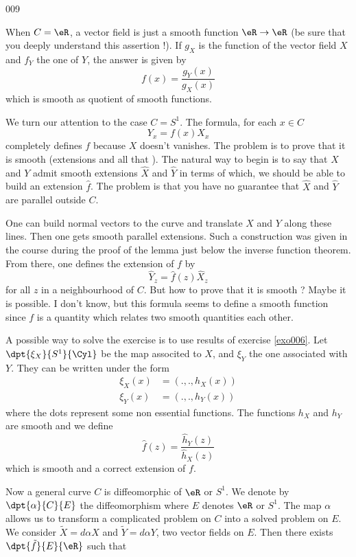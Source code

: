 \begin{corrige}{009}


When $C=\eR$, a vector field is just a smooth function $\eR\to\eR$ (be sure that you deeply understand this assertion !). If $g_X$ is the function of the vector field $X$ and $f_Y$ the one of $Y$, the answer is given by 
\begin{equation}
  f(x)=\frac{ g_Y(x) }{ g_X(x) }
\end{equation}
which is smooth as quotient of smooth functions.

We turn our attention to the case $C=S^1$. The formula, for each $x\in C$
\[ 
  Y_x=f(x)X_x
\]
completely defines $f$ because $X$ doesn't vanishes. The problem is to prove that it is smooth (extensions and all that {\huge\frownie}). The natural way to begin is to say that $X$ and $Y$ admit smooth extensions $\hat X$ and $\hat Y$ in terms of which, we should be able to build an extension $\hat f$. The problem is that you have no guarantee that $\hat X$ and $\hat Y$ are parallel outside $C$. 

One can build normal vectors to the curve and translate $X$ and $Y$ along these lines. Then one gets smooth parallel extensions. Such a construction was given in the course during the proof of the lemma just below the inverse function theorem. From there, one defines the extension of $f$ by
\[ 
  \hat Y_z=\hat f(z)\hat X_z
\]
for all $z$ in a neighbourhood of $C$. But how to prove that it is smooth ? Maybe it is possible. I don't know, but this formula seems to define a smooth function since $f$ is a quantity which relates two smooth quantities each other.


A possible way to solve the exercise is to use results of exercise \ref{exo006}. Let $\dpt{ \xi_X }{ S^1 }{ \Cyl }$ be the map associted to $X$, and $\xi_Y$ the one associated with $Y$. They can be written under the form
\begin{subequations}
\begin{align}
   \xi_X(x)&=(.,.,h_X(x))\\
   \xi_Y(x)&=(.,.,h_Y(x))
\end{align}
\end{subequations}
where the dots represent some non essential functions. The functions $h_X$ and $h_Y$ are smooth and we define
\[ 
  \hat f(z)=\frac{ \hat h_Y(z) }{ \hat h_X(z) }
\]
which is smooth and a correct extension of $f$.

Now a general curve $C$ is diffeomorphic of $\eR$ or $S^1$. We denote by $\dpt{ \alpha }{ C }{ E }$ the diffeomorphism where $E$ denotes $\eR$ or $S^1$. The map $\alpha$ allows us to transform a complicated problem on $C$ into a solved problem on $E$. We consider $\tilde X=d\alpha X$ and $\tilde Y=d\alpha Y$, two vector fields on $E$. Then there exists $\dpt{ \tilde f }{ E }{ \eR }$ such that 


\end{corrige}
